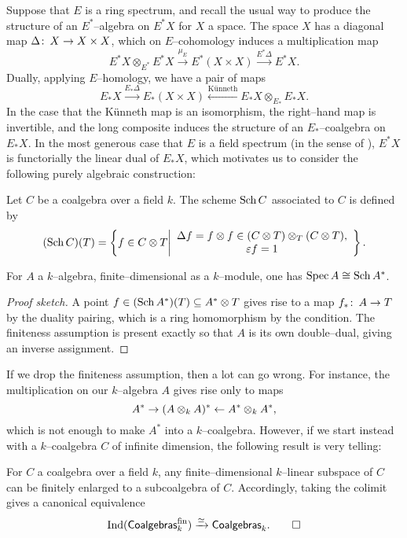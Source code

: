 Suppose that $E$ is a ring spectrum, and recall the usual way to produce the structure of an $E^*$--algebra on $E^* X$ for $X$ a space.  The space $X$ has a diagonal map $\Delta\colon\thinspace X \to X \times X$, which on $E$--cohomology induces a multiplication map \[E^* X \otimes_{E^*} E^* X \xrightarrow{\mu_E} E^*(X \times X) \xrightarrow{E^* \Delta} E^* X.\]  Dually, applying $E$--homology, we have a pair of maps \[E_* X \xrightarrow{E_* \Delta} E_*(X \times X) \xleftarrow{\text{K\"unneth}} E_* X \otimes_{E_*} E_* X.\]  In the case that the K\"unneth map is an isomorphism, the right--hand map is invertible, and the long composite induces the structure of an $E_*$--coalgebra on $E_* X$.  In the most generous case that $E$ is a field spectrum (in the sense of ), $E^* X$ is functorially the linear dual of $E_* X$, which motivates us to consider the following purely algebraic construction:

\begin{definition}
Let $C$ be a coalgebra over a field $k$.  The scheme $\operatorname{Sch} C$ associated to $C$ is defined by \[(\operatorname{Sch} C)(T) = \left\{f \in C \otimes T \middle| \begin{array}{c} \Delta f = f \otimes f \in (C \otimes T) \otimes_T (C \otimes T), \\ \varepsilon f = 1 \end{array} \right\}.\]
\end{definition}

\begin{lemma}
For $A$ a $k$--algebra, finite--dimensional as a $k$--module, one has $\operatorname{Spec} A \cong \operatorname{Sch} A^*$.
\end{lemma}
\begin{proof}[Proof sketch]
A point $f \in (\operatorname{Sch} A^*)(T) \subseteq A^* \otimes T$ gives rise to a map $f_*\colon\thinspace A \to T$ by the duality pairing, which is a ring homomorphism by the condition.  The finiteness assumption is present exactly so that $A$ is its own double--dual, giving an inverse assignment.
\end{proof}

If we drop the finiteness assumption, then a lot can go wrong.  For instance, the multiplication on our $k$--algebra $A$ gives rise only to maps \[A^* \to (A \otimes_k A)^* \leftarrow A^* \otimes_k A^*,\] which is not enough to make $A^*$ into a $k$--coalgebra.  However, if we start instead with a $k$--coalgebra $C$ of infinite dimension, the following result is very telling:

\begin{lemma}\label{kCoalgebrasAreIndFinite}
For $C$ a coalgebra over a field $k$, any finite--dimensional $k$--linear subspace of $C$ can be finitely enlarged to a subcoalgebra of $C$.  Accordingly, taking the colimit gives a canonical equivalence \[\operatorname{Ind}(\mathsf{Coalgebras}_k^{\mathrm{fin}}) \xrightarrow{\simeq} \mathsf{Coalgebras}_k. \qed\]
\end{lemma}

